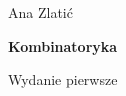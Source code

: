 

\thispagestyle{empty}
{\noindent\fontsize{18pt}{18pt}\selectfont Ana Zlatić}

\noindent\makebox[\linewidth]{\rule{\textwidth}{1pt}}

\vspace{10mm}

{\noindent\fontsize{24pt}{24pt}\selectfont \textbf{Kombinatoryka}}
\vspace{10mm}

{\noindent\fontsize{14pt}{14pt}\selectfont Wydanie pierwsze}

\newpage



